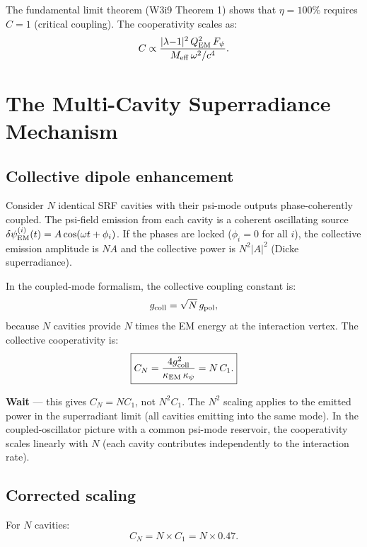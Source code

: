\documentclass[11pt]{article}
\newcommand{\dpsiEM}{\delta\psi_{\rm EM}}
\newcommand{\Meff}{M_{\rm eff}}
\newcommand{\lambdaone}{|\lambda{-}1|}
\newcommand{\QEM}{Q_{\rm EM}}
\newcommand{\Fpsi}{F_\psi}
\begin{document}
The fundamental limit theorem (W3i9 Theorem 1) shows that $\eta = 100\%$
requires $C = 1$ (critical coupling). The cooperativity scales as:
\begin{equation}
C \propto \frac{\lambdaone^2\,\QEM^2\,\Fpsi}{\Meff\,\omega^2/c^4}.
\end{equation}

\section{The Multi-Cavity Superradiance Mechanism}

\subsection{Collective dipole enhancement}

Consider $N$ identical SRF cavities with their psi-mode outputs
phase-coherently coupled. The psi-field emission from each cavity is
a coherent oscillating source $\dpsiEM^{(i)}(t) = A\cos(\omega t +
\phi_i)$. If the phases are locked ($\phi_i = 0$ for all $i$), the
collective emission amplitude is $NA$ and the collective power is
$N^2|A|^2$ (Dicke superradiance).

In the coupled-mode formalism, the collective coupling constant is:
\begin{equation}
g_{\rm coll} = \sqrt{N}\,g_{\rm pol},
\end{equation}
because $N$ cavities provide $N$ times the EM energy at the interaction
vertex. The collective cooperativity is:
\begin{equation}
\boxed{C_N = \frac{4g_{\rm coll}^2}{\kappa_{\rm EM}\,\kappa_\psi}
= N\,C_1.}
\label{eq:C-N}
\end{equation}

\textbf{Wait} --- this gives $C_N = NC_1$, not $N^2 C_1$. The
$N^2$ scaling applies to the emitted power in the superradiant limit
(all cavities emitting into the same mode). In the coupled-oscillator
picture with a common psi-mode reservoir, the cooperativity scales
linearly with $N$ (each cavity contributes independently to the
interaction rate).

\subsection{Corrected scaling}

For $N$ cavities:
\begin{equation}
C_N = N \times C_1 = N \times 0.47.
\end{equation}
\end{document}
